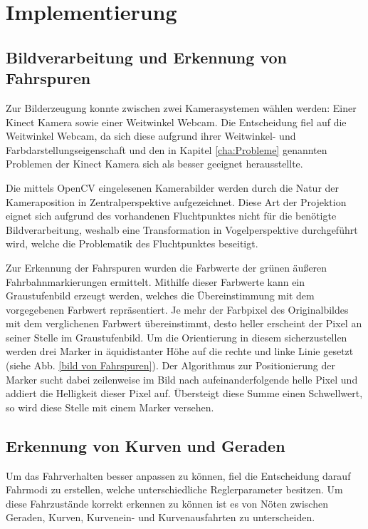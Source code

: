 \chapter{Implementierung}
\label{cha:Implementierung}
\section{Bildverarbeitung und Erkennung von Fahrspuren}
\label{sec:spurerkennung}


Zur Bilderzeugung konnte zwischen zwei Kamerasystemen wählen werden: Einer Kinect Kamera sowie einer Weitwinkel Webcam. Die Entscheidung fiel auf die Weitwinkel Webcam, da sich diese aufgrund ihrer Weitwinkel- und Farbdarstellungseigenschaft und den in Kapitel \ref{cha:Probleme} genannten Problemen der Kinect Kamera sich als besser geeignet herausstellte. 

Die mittels OpenCV eingelesenen Kamerabilder werden durch die Natur der Kameraposition in Zentralperspektive aufgezeichnet. Diese Art der Projektion eignet sich aufgrund des vorhandenen Fluchtpunktes nicht für die benötigte Bildverarbeitung, weshalb eine Transformation in Vogelperspektive durchgeführt wird, welche die Problematik des Fluchtpunktes beseitigt.

Zur Erkennung der Fahrspuren wurden die Farbwerte der grünen äußeren Fahrbahnmarkierungen ermittelt. Mithilfe dieser Farbwerte kann ein Graustufenbild erzeugt werden, welches die Übereinstimmung mit dem vorgegebenen Farbwert repräsentiert. Je mehr der Farbpixel des Originalbildes mit dem verglichenen Farbwert übereinstimmt, desto heller erscheint der Pixel an seiner Stelle im Graustufenbild. Um die Orientierung in diesem sicherzustellen werden drei Marker in äquidistanter Höhe auf die rechte und linke Linie gesetzt (siehe Abb. \ref{bild von Fahrspuren}). Der Algorithmus zur Positionierung der Marker sucht dabei zeilenweise im Bild nach aufeinanderfolgende helle Pixel und addiert die Helligkeit dieser Pixel auf. Übersteigt diese Summe einen Schwellwert, so wird diese Stelle mit einem Marker versehen.

\label{bild von Fahrspuren}
\section{Erkennung von Kurven und Geraden}
\label{sec:kurvenerkennung}
Um das Fahrverhalten besser anpassen zu können, fiel die Entscheidung darauf Fahrmodi zu erstellen, welche unterschiedliche Reglerparameter besitzen. Um diese Fahrzustände korrekt erkennen zu können ist es von Nöten zwischen Geraden, Kurven, Kurvenein- und Kurvenausfahrten zu unterscheiden.

